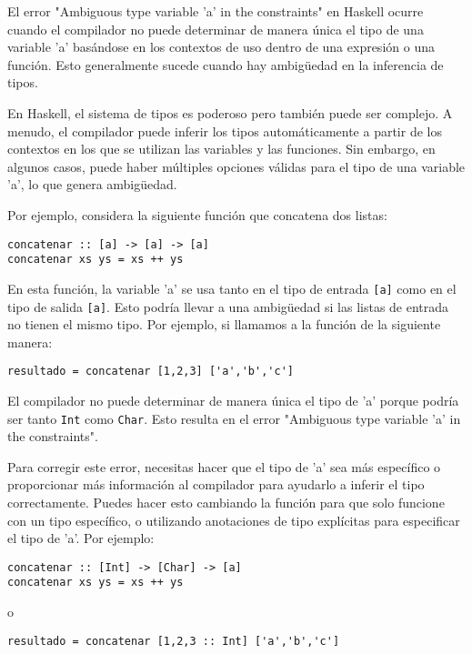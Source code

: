 \documentclass{article}
\begin{document}
El error "Ambiguous type variable 'a' in the constraints" en Haskell ocurre cuando el compilador no puede determinar de manera única el tipo de una variable 'a' basándose en los contextos de uso dentro de una expresión o una función. Esto generalmente sucede cuando hay ambigüedad en la inferencia de tipos.

En Haskell, el sistema de tipos es poderoso pero también puede ser complejo. A menudo, el compilador puede inferir los tipos automáticamente a partir de los contextos en los que se utilizan las variables y las funciones. Sin embargo, en algunos casos, puede haber múltiples opciones válidas para el tipo de una variable 'a', lo que genera ambigüedad.

Por ejemplo, considera la siguiente función que concatena dos listas:

\begin{verbatim}
concatenar :: [a] -> [a] -> [a]
concatenar xs ys = xs ++ ys
\end{verbatim}

En esta función, la variable 'a' se usa tanto en el tipo de entrada \texttt{[a]} como en el tipo de salida \texttt{[a]}. Esto podría llevar a una ambigüedad si las listas de entrada no tienen el mismo tipo. Por ejemplo, si llamamos a la función de la siguiente manera:

\begin{verbatim}
resultado = concatenar [1,2,3] ['a','b','c']
\end{verbatim}

El compilador no puede determinar de manera única el tipo de 'a' porque podría ser tanto \texttt{Int} como \texttt{Char}. Esto resulta en el error "Ambiguous type variable 'a' in the constraints".

Para corregir este error, necesitas hacer que el tipo de 'a' sea más específico o proporcionar más información al compilador para ayudarlo a inferir el tipo correctamente. Puedes hacer esto cambiando la función para que solo funcione con un tipo específico, o utilizando anotaciones de tipo explícitas para especificar el tipo de 'a'. Por ejemplo:

\begin{verbatim}
concatenar :: [Int] -> [Char] -> [a]
concatenar xs ys = xs ++ ys
\end{verbatim}

o

\begin{verbatim}
resultado = concatenar [1,2,3 :: Int] ['a','b','c']
\end{verbatim}
\end{document}

